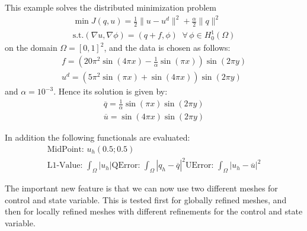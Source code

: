 This example solves the distributed minimization problem
\begin{gather*}
\min J(q,u) = \frac{1}{2} \|u-u^d\|^2 + \frac{\alpha}{2}\|q\|^2\\
\text{s.t.} (\nabla u,\nabla \phi) = (q+f,\phi)\;\;\forall\,\phi \in H^1_0(\Omega)
\end{gather*}
on the domain $\Omega = [0,1]^2$, and the data is chosen as follows:
\begin{gather*}
 f = \left(20\pi^2  \sin(4 \pi x) - \frac{1}{\alpha}  \sin(\pi x)\right) \sin(2 \pi y)\\
 u^d = \left( 5 \pi^2 \sin(\pi x) + \sin(4 \pi x)\right)  \sin(2\pi y)
\end{gather*}
and $\alpha = 10^{-3}$.
Hence its solution is given by:
\begin{gather*}
 \overline{q} = \frac{1}{\alpha} \sin(\pi x) \sin(2 \pi y)\\
 \overline{u} = \sin(4 \pi x) \sin(2 \pi y)
\end{gather*}

In addition the following functionals are evaluated:
\begin{gather*}
  \text{MidPoint: } u_h(0.5 ; 0.5)\\[2mm]
  \text{L1-Value: }\int_\Omega |u_h|
  \text{QError: }\int_\Omega |q_h-\overline{q}|^2
  \text{UError: }\int_\Omega |u_h-\overline{u}|^2
\end{gather*}

The important new feature is that we can now use two different meshes for control and state variable.
This is tested first for globally refined meshes, and then for locally refined meshes with different refinements 
for the control and state variable.

